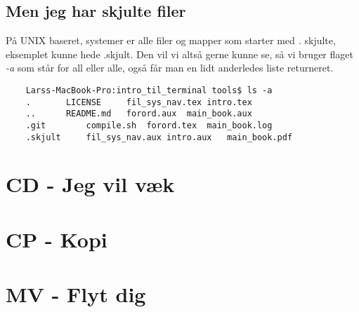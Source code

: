 \subsection*{Men jeg har skjulte filer}
På UNIX baseret, systemer er alle filer og mapper som starter med \textit{.} skjulte, eksemplet kunne hede .skjult. Den vil vi altså gerne kunne se, så vi bruger flaget \textit{-a} som står for all eller alle, også får man en lidt anderledes liste returneret.
\begin{lstlisting}
	Larss-MacBook-Pro:intro_til_terminal tools$ ls -a
	.		LICENSE		fil_sys_nav.tex	intro.tex	
	..		README.md	forord.aux	main_book.aux	
	.git		compile.sh	forord.tex	main_book.log	
	.skjult		fil_sys_nav.aux	intro.aux	main_book.pdf	
\end{lstlisting}
\section{CD - Jeg vil væk}

\section{CP - Kopi}

\section{MV - Flyt dig}

